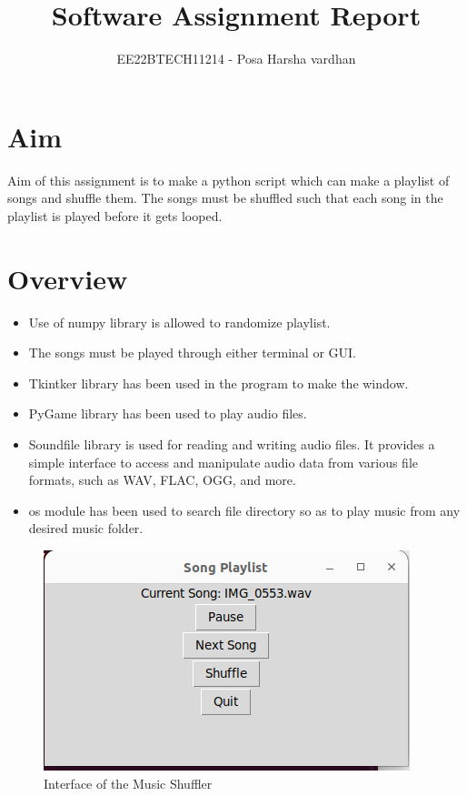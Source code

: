 \documentclass{article}
\begin{document}
\title{Software Assignment Report}
\author{EE22BTECH11214 -  Posa Harsha vardhan}
\date{}
\maketitle
\maketitle
\section{Aim}
Aim of this assignment is to make a python script which can make a playlist of songs and shuffle them. The songs must be shuffled such that each song in the playlist is played before it gets looped.
\section{Overview}
\begin{itemize}
\item Use of numpy library is allowed to randomize playlist.
\item The songs must be played through either terminal or GUI.
\item Tkintker library has been used in the program to make the window.
\item PyGame library has been used to play audio files.
\item Soundfile library is used for reading and writing audio files. It provides a simple interface to access and manipulate audio data from various file formats, such as WAV, FLAC, OGG, and more.
\item os module has been used to search file directory so as to play music from any desired music folder.
\end{itemize}
\begin{figure}[ht]
\centering
\includegraphics[width=0.7\linewidth]{figs/s1.png}
\caption{Interface of the Music Shuffler}
\end{figure}
\FloatBarrier
\end{document}
